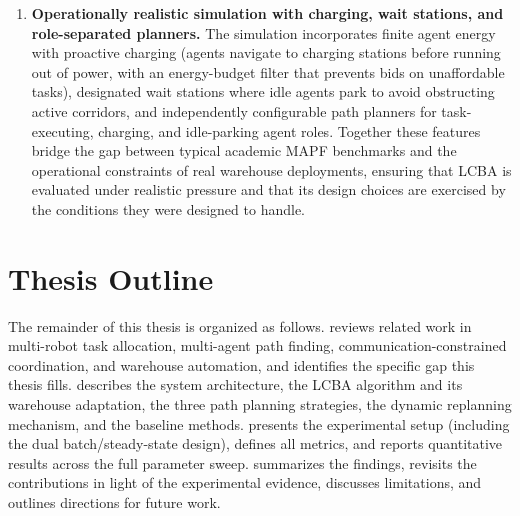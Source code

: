 \begin{enumerate}
  \item \textbf{Operationally realistic simulation with charging, wait stations,
        and role-separated planners.}
        The simulation incorporates finite agent energy with proactive charging
        (agents navigate to charging stations before running out of power, with an
        energy-budget filter that prevents bids on unaffordable tasks),
        designated wait stations where idle agents park to avoid obstructing active
        corridors, and independently configurable path planners for task-executing,
        charging, and idle-parking agent roles.
        Together these features bridge the gap between typical academic MAPF benchmarks
        and the operational constraints of real warehouse deployments, ensuring that
        LCBA is evaluated under realistic pressure and that its design choices are
        exercised by the conditions they were designed to handle.
\end{enumerate}


\section{Thesis Outline}
\label{sec:intro_outline}

The remainder of this thesis is organized as follows.
 reviews related work in multi-robot task allocation,
multi-agent path finding, communication-constrained coordination, and warehouse
automation, and identifies the specific gap this thesis fills.
 describes the system architecture, the LCBA algorithm
and its warehouse adaptation, the three path planning strategies, the dynamic
replanning mechanism, and the baseline methods.
 presents the experimental setup (including the dual
batch/steady-state design), defines all metrics, and reports quantitative
results across the full parameter sweep.
 summarizes the findings, revisits the contributions
in light of the experimental evidence, discusses limitations, and outlines
directions for future work.